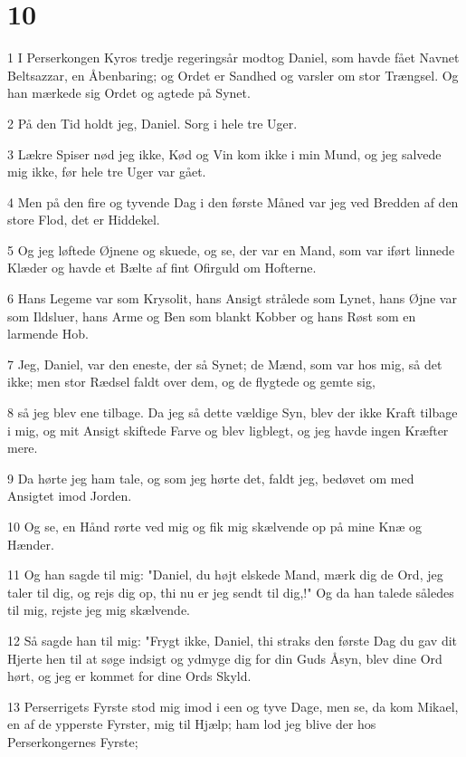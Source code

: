\chapter{10}

\par 1 I Perserkongen Kyros tredje regeringsår modtog Daniel, som havde fået Navnet Beltsazzar, en Åbenbaring; og Ordet er Sandhed og varsler om stor Trængsel. Og han mærkede sig Ordet og agtede på Synet.
\par 2 På den Tid holdt jeg, Daniel. Sorg i hele tre Uger.
\par 3 Lækre Spiser nød jeg ikke, Kød og Vin kom ikke i min Mund, og jeg salvede mig ikke, før hele tre Uger var gået.
\par 4 Men på den fire og tyvende Dag i den første Måned var jeg ved Bredden af den store Flod, det er Hiddekel.
\par 5 Og jeg løftede Øjnene og skuede, og se, der var en Mand, som var iført linnede Klæder og havde et Bælte af fint Ofirguld om Hofterne.
\par 6 Hans Legeme var som Krysolit, hans Ansigt strålede som Lynet, hans Øjne var som Ildsluer, hans Arme og Ben som blankt Kobber og hans Røst som en larmende Hob.
\par 7 Jeg, Daniel, var den eneste, der så Synet; de Mænd, som var hos mig, så det ikke; men stor Rædsel faldt over dem, og de flygtede og gemte sig,
\par 8 så jeg blev ene tilbage. Da jeg så dette vældige Syn, blev der ikke Kraft tilbage i mig, og mit Ansigt skiftede Farve og blev ligblegt, og jeg havde ingen Kræfter mere.
\par 9 Da hørte jeg ham tale, og som jeg hørte det, faldt jeg, bedøvet om med Ansigtet imod Jorden.
\par 10 Og se, en Hånd rørte ved mig og fik mig skælvende op på mine Knæ og Hænder.
\par 11 Og han sagde til mig: "Daniel, du højt elskede Mand, mærk dig de Ord, jeg taler til dig, og rejs dig op, thi nu er jeg sendt til dig,!" Og da han talede således til mig, rejste jeg mig skælvende.
\par 12 Så sagde han til mig: "Frygt ikke, Daniel, thi straks den første Dag du gav dit Hjerte hen til at søge indsigt og ydmyge dig for din Guds Åsyn, blev dine Ord hørt, og jeg er kommet for dine Ords Skyld.
\par 13 Perserrigets Fyrste stod mig imod i een og tyve Dage, men se, da kom Mikael, en af de ypperste Fyrster, mig til Hjælp; ham lod jeg blive der hos Perserkongernes Fyrste;
